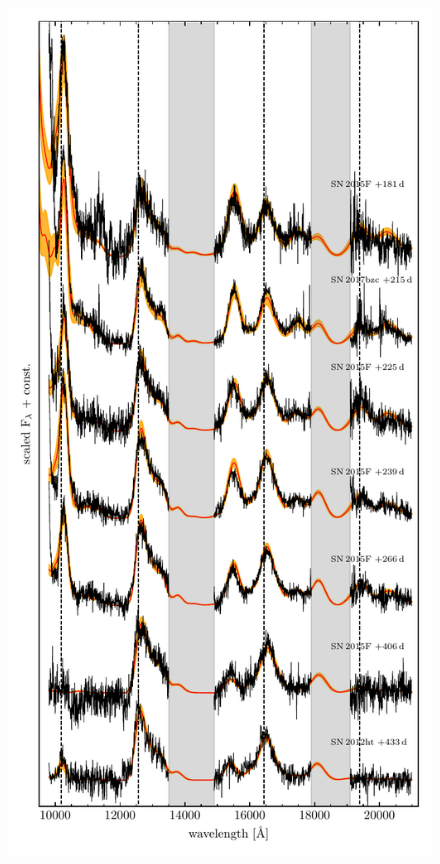 \documentclass[fleqn,usenatbib]{mnras}
\begin{document}
\begin{figure}
\begin{minipage}{.475\textwidth}
    \end{minipage}%
    \begin{minipage}{.475\textwidth}
        \centering
        \includegraphics[width=1\linewidth]{plots/Spectra_15F_XSHOOTER_NIR.pdf}
    \end{minipage}

\end{figure}
\end{document}
